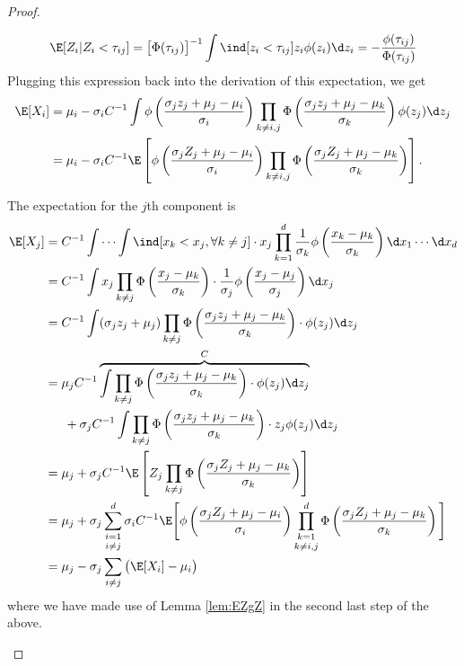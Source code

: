 \begin{proof}
\begin{enumerate}[label=(\roman*)]
  \[
    \E[Z_i | Z_i < \tau_{ij}] 
    = \big[\Phi(\tau_{ij})\big]^{-1} \int \ind [z_i < \tau_{ij}] z_i \phi(z_i) \d z_i 
    = - \frac{\phi(\tau_{ij})}{\Phi(\tau_{ij})}
  \] Plugging this expression back into the derivation of this expectation, we get
  \begin{align*}
  \E[X_i] 
  &= \mu_i -  \sigma_i C^{-1} \int 
  \phi \left( \frac{\sigma_j z_j + \mu_j - \mu_i}{\sigma_i} \right)
  \prod_{k \neq i,j} \Phi \left( \frac{\sigma_j z_j + \mu_j - \mu_k}{\sigma_k} \right) \phi (z_j) \d z_j \\
  &= \mu_i - \sigma_i C^{-1} \E \left[ \phi \left( \frac{\sigma_j Z_j + \mu_j - \mu_i}{\sigma_i} \right)
  \prod_{k \neq i,j} \Phi \left( \frac{\sigma_j Z_j + \mu_j - \mu_k}{\sigma_k} \right) \right].
  \end{align*}
  
  The expectation for the $j$th component is
  \begin{align*}
    \E[X_j] 
    &= C^{-1} \idotsint \ind[x_k < x_j, \forall k \neq j] \cdot x_j  \prod_{k=1}^d \frac{1}{\sigma_k}\phi \left( \frac{x_k - \mu_k}{\sigma_k} \right) \d x_1 \cdots \d x_d \\
    &= C^{-1} \int x_j  \prod_{k \neq j} \Phi \left( \frac{x_j - \mu_k}{\sigma_k} \right) 
    \cdot \frac{1}{\sigma_j} \phi \left( \frac{x_j - \mu_j}{\sigma_j} \right) \d x_j  \\    
    &= C^{-1} \int (\sigma_j z_j + \mu_j)  \prod_{k \neq j} \Phi \left( \frac{\sigma_j z_j + \mu_j - \mu_k}{\sigma_k} \right) \cdot \phi (z_j) \d z_j  \\   
    &= \mu_j C^{-1} 
    \overbrace{
    \int  \prod_{k \neq j} \Phi \left( \frac{\sigma_j z_j + \mu_j - \mu_k}{\sigma_k} \right) \cdot \phi (z_j) \d z_j
    }^{C}  \\   
    &\phantom{==} + \sigma_j C^{-1} \int  \prod_{k \neq j} \Phi \left( \frac{\sigma_j z_j + \mu_j - \mu_k}{\sigma_k} \right) \cdot z_j \phi (z_j) \d z_j \\
    &= \mu_j + \sigma_j C^{-1} \E \left[ Z_j \prod_{k \neq j} \Phi \left( \frac{\sigma_j Z_j + \mu_j - \mu_k}{\sigma_k} \right) \right] \\
    &= \mu_j + \sigma_j  \mathop{\sum_{i=1}^d}_{i \neq j} \sigma_i C^{-1} \E \Bigg[ \phi \left( \frac{\sigma_j Z_j + \mu_j - \mu_i}{\sigma_i} \right) \mathop{\prod_{k=1}^d}_{k \neq i,j} \Phi \left( \frac{\sigma_j Z_j + \mu_j - \mu_k}{\sigma_k} \right) \Bigg] \\
    &= \mu_j - \sigma_j \sum_{i \neq j} \big(\E[X_i] - \mu_i \big)
  \end{align*}
  where we have made use of Lemma \ref{lem:EZgZ} in the second last step of the above.


\end{enumerate}
\end{proof}
